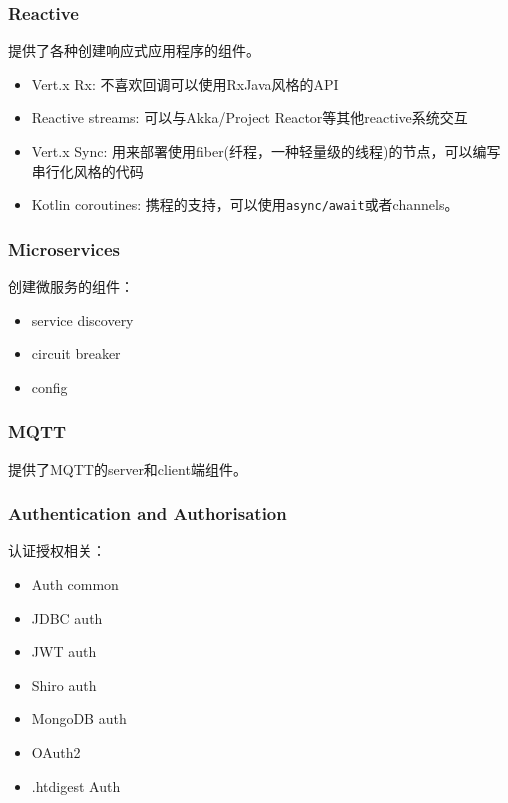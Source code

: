 \documentclass[12pt]{article}
\begin{document}
\subsubsection{Reactive}\label{reactive}

提供了各种创建响应式应用程序的组件。

\begin{itemize}
\tightlist
\item
  Vert.x Rx: 不喜欢回调可以使用RxJava风格的API
\item
  Reactive streams: 可以与Akka/Project Reactor等其他reactive系统交互
\item
  Vert.x Sync: 用来部署使用fiber(纤程，一种轻量级的线程)的节点，可以编写串行化风格的代码
\item
  Kotlin coroutines: 携程的支持，可以使用\texttt{async/await}或者channels。
\end{itemize}

\subsubsection{Microservices}\label{microservices}

创建微服务的组件：

\begin{itemize}
\tightlist
\item
  service discovery
\item
  circuit breaker
\item
  config
\end{itemize}

\subsubsection{MQTT}\label{mqtt}

提供了MQTT的server和client端组件。

\subsubsection{Authentication and Authorisation}\label{authentication-and-authorisation}

认证授权相关：

\begin{itemize}
\tightlist
\item
  Auth common
\item
  JDBC auth
\item
  JWT auth
\item
  Shiro auth
\item
  MongoDB auth
\item
  OAuth2
\item
  .htdigest Auth
\end{itemize}
\end{document}
